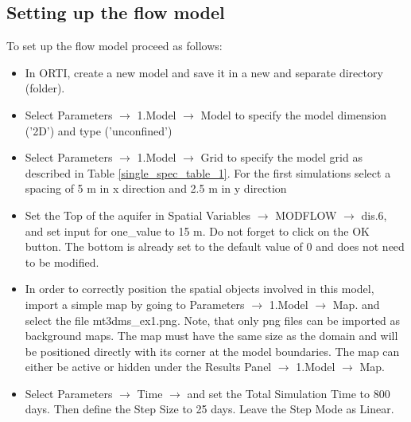 \subsection{Setting up the flow model}

To set up the flow model proceed as follows:

\begin{itemize}

\item In ORTI, create a new model and save it in a new and separate directory (folder).

\item Select {\color{blue}Parameters} $\rightarrow$ 
{\color{blue}1.Model} $\rightarrow$ 
{\color{blue}Model} to specify the model dimension {\color{blue}('2D')} and type {\color{blue}('unconfined')}

\item Select {\color{blue}Parameters} $\rightarrow$ {\color{blue}1.Model} 
$\rightarrow$ {\color{blue}Grid} to specify
the model grid as described in Table \ref{single_spec_table_1}. For the first simulations 
select a spacing of 5 m in x direction and 2.5 m in y direction

\item Set the Top of the aquifer in {\color{blue}Spatial Variables} $\rightarrow$ {\color{blue}MODFLOW} 
$\rightarrow$ {\color{blue}dis.6}, and set input for {\color{blue}one\_value} to 15 m. 
Do not forget to click on the {\color{blue}OK} button. 
The bottom is already set to the default value of 0 and does not need to be modified.

\item In order to correctly position the spatial objects involved in this model, 
import a simple map by going to {\color{blue}Parameters} $\rightarrow$ 
{\color{blue}1.Model} 
$\rightarrow$ 
{\color{blue}Map.} 
and select the file 
{\color{blue}mt3dms\_ex1.png}.
Note, that only png files can be imported as background maps.
The map must have the same size as the domain and will be positioned directly with 
its corner at the model boundaries. The map can either be active or hidden under
the {\color{blue}Results Panel} $\rightarrow$ {\color{blue}1.Model} $\rightarrow$ {\color{blue}Map}.

\item Select {\color{blue}Parameters} $\rightarrow$ {\color{blue}Time} $\rightarrow$ 
and set the  {\color{blue} Total Simulation Time} to 800 days. 
Then define the {\color{blue}Step Size} to 25 days. Leave the {\color{blue}Step Mode} as Linear. 


\end{itemize}
